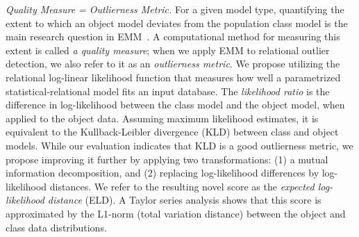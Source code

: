 {{\em Quality Measure = Outlierness Metric.} For a given model type, quantifying the extent to which an object model deviates from the population class model is the main research question in EMM~\citep{Duivesteijn2016}. A computational method for measuring this extent is called {\em a quality measure}; when we apply EMM to relational outlier detection, we also refer to it as an {\em outlierness metric}. We propose utilizing the relational log-linear likelihood function \citep{Kimmig2014,Schulte2011} that measures how well a parametrized statistical-relational model fits an input database. The {\em likelihood ratio} is the difference in log-likelihood between the class model and the object model, when applied to the object data. Assuming maximum likelihood estimates, it is equivalent to the Kullback-Leibler divergence (KLD) between class and object models. While our evaluation indicates that KLD is a good outlierness metric, we propose improving it further by applying two transformations: (1) a mutual information decomposition, and (2) replacing log-likelihood differences by log-likelihood distances. We refer to the resulting novel score as the {\em expected log-likelihood distance} (ELD). A Taylor series analysis shows that this score  is approximated by the L1-norm (total variation distance) between the object and class data distributions.


}
